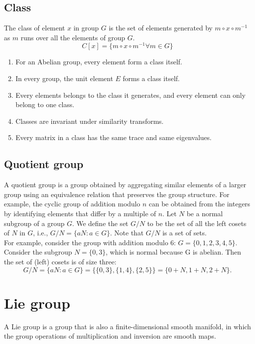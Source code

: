 \begin{refsection}
\subsection{Class}
\begin{definition}
The class of element $x$ in group $G$ is the set of elements generated by $m \circ x \circ m^{-1}$ as $m$ runs over all the elements of group $G$. $$C[x] = \{m \circ x \circ m^{-1} \forall m \in G  \}$$	
\end{definition}


\begin{remark}\hfill
\begin{enumerate}
\item For an Abelian group, every element form a class itself.
\item In every group, the unit element $E$ forms a class itself.
\item Every elements belongs to the class it generates, and every element can only belong to one class.
\item Classes are invariant under similarity transforms.
\item Every matrix in a class has the same trace and same eigenvalues.
\end{enumerate}
\end{remark}


\subsection{Quotient group}
\begin{remark}
A quotient group is a group obtained by aggregating similar elements of a larger group using an equivalence relation that preserves the group structure. For example, the cyclic group of addition modulo $n$ can be obtained from the integers by identifying elements that differ by a multiple of $n$. Let $N$ be a normal subgroup of a group $G$. We define the set $G/N$ to be the set of all the left cosets of $N$ in $G$, i.e., $G/N=\{aN:a\in G\}$. Note that $G/N$ is a set of sets.  \\
For example, consider the group with addition modulo 6: $G = \{0, 1, 2, 3, 4, 5\}$. Consider the subgroup $N = \{0, 3\}$, which is normal because G is abelian. Then the set of (left) cosets is of size three:$$
G/N = \{ aN : a \in G \} = \{ \{0, 3\}, \{1, 4\}, \{2, 5\} \} = \{ 0+N , 1+N, 2+N \}.
$$	
\end{remark}




\section{Lie group}
\begin{definition}
A Lie group is a group that is also a finite-dimensional smooth manifold, in which the group operations of multiplication and inversion are smooth maps. 
\end{definition}


\end{refsection}
